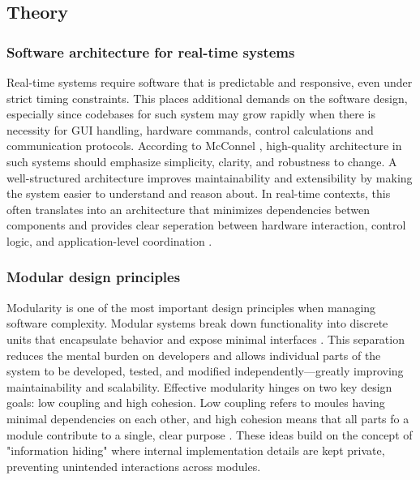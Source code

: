 
\subsection{Theory}
\subsubsection{Software architecture for real-time systems}
Real-time systems require software that is predictable and responsive, even under strict timing constraints. This places additional demands on the software design, especially since codebases for such system may grow rapidly when there is necessity for GUI handling, hardware commands, control calculations and communication protocols. According to McConnel \cite{steve_mcconnell_code_nodate}, high-quality architecture in such systems should emphasize simplicity, clarity, and robustness to change. 
\newline \newline
A well-structured architecture improves maintainability and extensibility by making the system easier to understand and reason about. In real-time contexts, this often translates into an architecture that minimizes dependencies betwen components and provides clear seperation between hardware interaction, control logic, and application-level coordination \cite{tanenbaum_distributed_2007}.

\subsubsection{Modular design principles}
Modularity is one of the most important design principles when managing software complexity. Modular systems break down functionality into discrete units that encapsulate behavior and expose minimal interfaces \cite{steve_mcconnell_code_nodate}. This separation reduces the mental burden on developers and allows individual parts of the system to be developed, tested, and modified independently—greatly improving maintainability and scalability.
\newline \newline
Effective modularity hinges on two key design goals: low coupling and high cohesion. Low coupling refers to moules having minimal dependencies on each other, and high cohesion means that all parts fo a module contribute to a single, clear purpose \cite{steve_mcconnell_code_nodate}. These ideas build on the concept of "information hiding" \cite{parnas_criteria_1972} where internal implementation details are kept private, preventing unintended interactions across modules.

